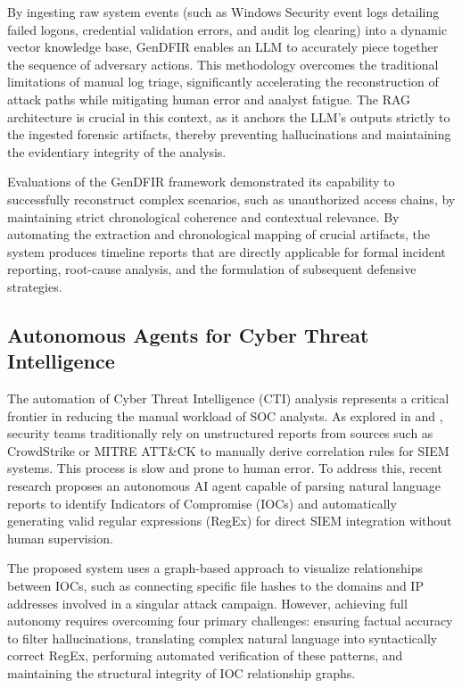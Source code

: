 \documentclass[conference]{IEEEtran}
\begin{document}
By ingesting raw system events (such as Windows Security event logs detailing failed logons, credential validation errors, and audit log clearing) into a dynamic vector knowledge base, GenDFIR enables an LLM to accurately piece together the sequence of adversary actions. 
This methodology overcomes the traditional limitations of manual log triage, significantly accelerating the reconstruction of attack paths while mitigating human error and analyst fatigue. 
The RAG architecture is crucial in this context, as it anchors the LLM's outputs strictly to the ingested forensic artifacts, thereby preventing hallucinations and maintaining the evidentiary integrity of the analysis.

Evaluations of the GenDFIR framework demonstrated its capability to successfully reconstruct complex scenarios,  
such as unauthorized access chains, by maintaining strict chronological coherence and contextual relevance. 
By automating the extraction and chronological mapping of crucial artifacts, the system produces timeline reports that are directly applicable for formal incident reporting, 
root-cause analysis, and the formulation of subsequent defensive strategies.

\subsection{Autonomous Agents for Cyber Threat Intelligence}\label{sec:cti_start}
The automation of Cyber Threat Intelligence (CTI) analysis represents a critical frontier in reducing the manual workload of SOC analysts. 
As explored in \cite{b5} and \cite{b6}, security teams traditionally rely on unstructured reports from sources such as CrowdStrike or MITRE ATT\&CK 
to manually derive correlation rules for SIEM systems. This process is slow and prone to human error. 
To address this, recent research proposes an autonomous AI agent capable of parsing natural language reports to identify Indicators of Compromise (IOCs) 
and automatically generating valid regular expressions (RegEx) for direct SIEM integration without human supervision.

The proposed system uses a graph-based approach to visualize relationships between IOCs, such as connecting specific file hashes to the domains and IP addresses 
involved in a singular attack campaign. However, achieving full autonomy requires overcoming four primary challenges: 
ensuring factual accuracy to filter hallucinations, translating complex natural language into syntactically correct RegEx, performing automated verification of these patterns, and maintaining the structural integrity of IOC relationship graphs.
\end{document}
